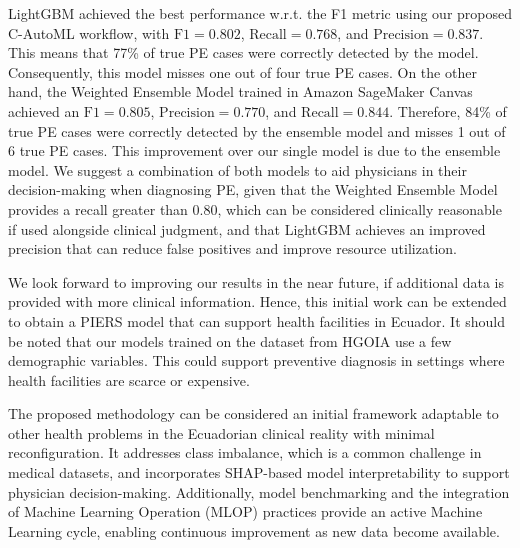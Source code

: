 \documentclass[diagnostics,article,accept,pdftex,moreauthors]{Definitions/mdpi}
\begin{document}
LightGBM achieved the best performance \ac{w.r.t.} the
\ac{F1} metric using our proposed \ac{C-AutoML} workflow, with
$\mathrm{F1}=0.802$, $\mathrm{Recall}=0.768$, and
$\mathrm{Precision}=0.837$. This means that 77\% of true \ac{PE}
cases were correctly detected by the model. Consequently, this model
misses one out of four true \ac{PE} cases. On the other hand, the
Weighted Ensemble Model trained in Amazon SageMaker Canvas achieved an
$\mathrm{F1}=0.805$, $\mathrm{Precision}=0.770$, and
$\mathrm{Recall}=0.844$. Therefore, 84\% of true \ac{PE} cases
were correctly detected by the ensemble model and misses 1 out of 6
true \ac{PE} cases. This improvement over our single model is due
to the ensemble model. We suggest a combination of both models
to aid physicians in their decision-making when diagnosing \ac{PE},
given that the Weighted Ensemble Model provides a
recall greater than 0.80, which can be considered clinically
reasonable if used alongside clinical judgment, and that
LightGBM achieves an improved precision that can reduce false
positives and improve resource utilization. 

We look forward to improving our results in the near future, if
additional data is provided with more clinical information. Hence,
this initial work can be extended to obtain a \ac{PIERS} model that
can support health facilities in Ecuador. It should be noted that our
models trained on the dataset from \ac{HGOIA} use a few
demographic variables. This could support preventive diagnosis in
settings where health facilities are scarce or expensive.

The proposed methodology can be considered an initial framework
adaptable to other health problems in the Ecuadorian clinical reality
with minimal reconfiguration. It addresses class imbalance, which is
a common challenge in medical datasets, and incorporates
\ac{SHAP}-based model interpretability to support physician
decision-making. Additionally, model benchmarking and the integration
of Machine Learning Operation (MLOP) practices provide an active Machine Learning cycle,
enabling continuous improvement as new data become available.

\end{document}
